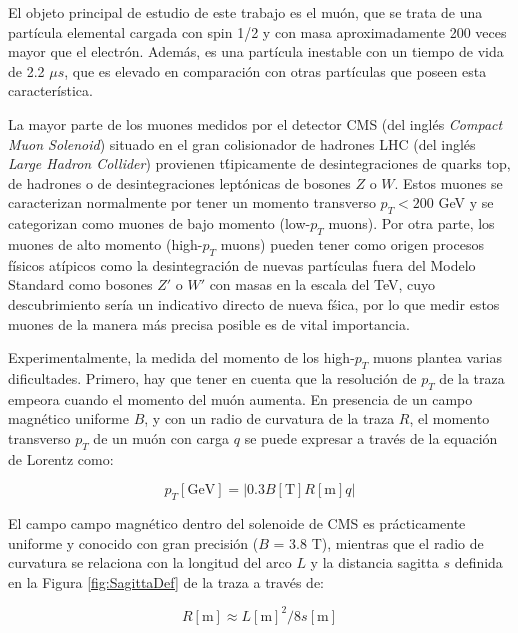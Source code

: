 
El objeto principal de estudio de este trabajo es el mu\'on, que se trata de una part\'icula elemental cargada con spin 1/2 y con masa aproximadamente 200 veces mayor que el electr\'on. Adem\'as, es una part\'icula inestable con un tiempo de vida de 2.2 $\mu s$, que es elevado en comparaci\'on con otras part\'iculas que poseen esta caracter\'istica.

La mayor parte de los muones medidos por el detector CMS (del ingl\'es \textit{Compact Muon Solenoid}) situado en el gran colisionador de hadrones LHC (del ingl\'es \textit{Large Hadron Collider}) provienen t\'tipicamente de desintegraciones de quarks top, de hadrones o de desintegraciones lept\'onicas de bosones $Z$ o $W$. Estos muones se caracterizan normalmente por tener un momento transverso $p_{T} < 200$ GeV y se categorizan como muones de bajo momento (low-$p_{T}$ muons). Por otra parte, los muones de alto momento (high-$p_{T}$ muons) pueden tener como origen procesos f\'isicos at\'ipicos como la desintegraci\'on de nuevas part\'iculas fuera del Modelo Standard como bosones $Z'$ o $W'$ con masas en la escala del TeV, cuyo descubrimiento ser\'ia un indicativo directo de nueva f\'sica, por lo que medir estos muones de la manera m\'as precisa posible es de vital importancia.

Experimentalmente, la medida del momento de los high-$p_{T}$ muons plantea varias dificultades. Primero, hay que tener en cuenta que la resoluci\'on de $p_{T}$ de la traza empeora cuando el momento del mu\'on aumenta.
En presencia de un campo magn\'etico uniforme $B$, y con un radio de curvatura de la traza $R$, el momento transverso $p_{T}$ de un mu\'on con carga $q$ se puede expresar a trav\'es de la equaci\'on de Lorentz como:

\begin{equation}
  p_{T}[\text{GeV}] = \left|0.3 B[\text{T}] R[\text{m}] q\right|
\label{eq:pTvsRadius}
\end{equation}

El campo campo magn\'etico dentro del solenoide de CMS es pr\'acticamente uniforme y conocido con gran precisi\'on ($B$ = 3.8 T), mientras que el radio de curvatura se relaciona con la longitud del arco $L$ y la distancia sagitta $s$ definida en la Figura \ref{fig:SagittaDef} de la traza a trav\'es de:

\begin{equation}
  R[\text{m}]\approx L[\text{m}]^{2}/8s[\text{m}]
\label{eq:RadiusvsSagitta}
\end{equation}

